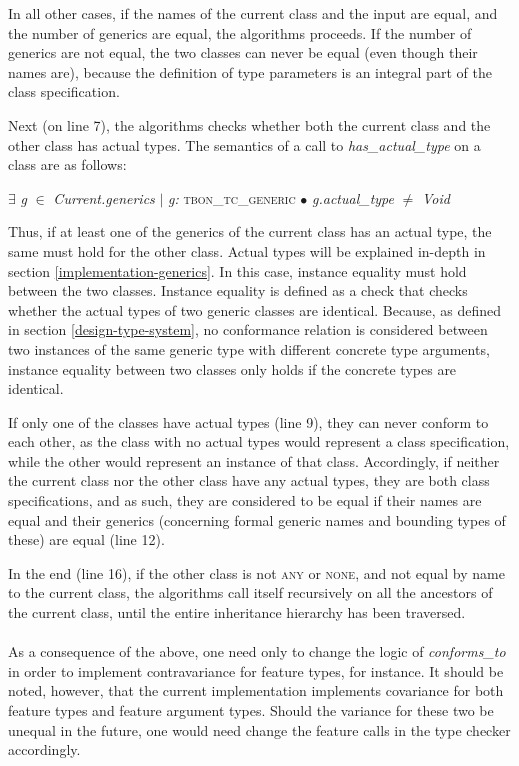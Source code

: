 In all other cases, if the names of the current class and the input are equal, and the number of generics are equal, the algorithms proceeds. If the number of generics are not equal, the two classes can never be equal (even though their names are), because the definition of type parameters is an integral part of the class specification.

Next (on line 7), the algorithms checks whether both the current class and the other class has actual types. The semantics of a call to \textit{has\_actual\_type} on a class are as follows:

{\footnotesize
\begin{center} 
$\exists$ \textit{g} $\in$ \textit{Current.generics} $\mid$ \textit{g:} \textsc{tbon\_tc\_generic} $\bullet$ \textit{g.actual\_type} $\neq$ \textit{Void}
\end{center}}

Thus, if at least one of the generics of the current class has an actual type, the same must hold for the other class. Actual types will be explained in-depth in section \ref{implementation-generics}. In this case, instance equality must hold between the two classes. Instance equality is defined as a check that checks whether the actual types of two generic classes are identical. Because, as defined in section \ref{design-type-system}, no conformance relation is considered between two instances of the same generic type with different concrete type arguments, instance equality between two classes only holds if the concrete types are identical.

If only one of the classes have actual types (line 9), they can never conform to each other, as the class with no actual types would represent a class specification, while the other would represent an instance of that class. Accordingly, if neither the current class nor the other class have any actual types, they are both class specifications, and as such, they are considered to be equal if their names are equal and their generics (concerning formal generic names and bounding types of these) are equal (line 12).

In the end (line 16), if the other class is not \textsc{any} or \textsc{none}, and not equal by name to the current class, the algorithms call itself recursively on all the ancestors of the current class, until the entire inheritance hierarchy has been traversed. 
\paragraph{}
As a consequence of the above, one need only to change the logic of \textit{conforms\_to} in order to implement contravariance for feature types, for instance. It should be noted, however, that the current implementation implements covariance for both feature types and feature argument types. Should the variance for these two be unequal in the future, one would need change the feature calls in the type checker accordingly.

